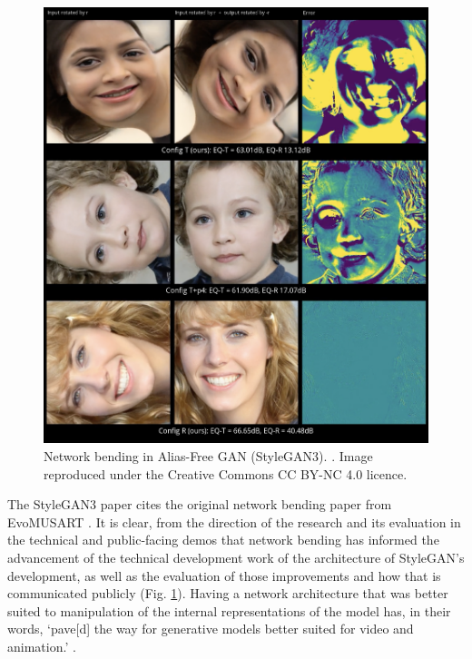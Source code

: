  \begin{figure}[!htb]
    \centering
    \captionsetup{justification=centering}
    \includegraphics[width=1\textwidth]{figures/c7_impact/net-bend-technical/style-gan-rotations.png}
    \caption[Network bending in Alias-Free GAN (StyleGAN3)]{Network bending in Alias-Free GAN (StyleGAN3). \citep{karras2021alias}. Image reproduced under the Creative Commons CC BY-NC 4.0 licence.}
    \label{fig:c7:alias-free-gan}
\end{figure}

 The StyleGAN3 paper cites the original network bending paper from EvoMUSART \citep{broad2021network}.
 It is clear, from the direction of the research and its evaluation in the technical and public-facing demos that network bending has informed the advancement of the technical development work of the architecture of StyleGAN's development, as well as the evaluation of those improvements and how that is communicated publicly  (Fig. \ref{fig:c7:alias-free-gan}). 
 Having a network architecture that was better suited to manipulation of the internal representations of the model has, in their words, `pave[d] the way for generative models better suited for video and animation.' \citep{karras2021alias}.

